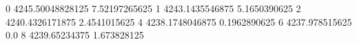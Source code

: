 0 4245.50048828125 7.52197265625
1 4243.1435546875 5.1650390625
2 4240.4326171875 2.4541015625
4 4238.1748046875 0.1962890625
6 4237.978515625 0.0
8 4239.65234375 1.673828125
